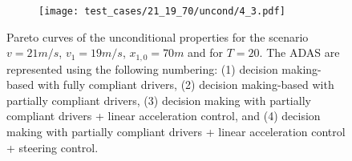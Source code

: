 \begin{figure}[H]
\begin{subfigure}{0.32\textwidth}
\end{subfigure}
\begin{subfigure}{0.32\textwidth}
  \centering
  \texttt{[image: test\_cases/21\_19\_70/uncond/4\_3.pdf]}
\end{subfigure}
\caption{Pareto curves of the unconditional properties for the scenario $v = 21m/s$, $v_1 = 19m/s$, $x_{1,0} = 70m$ and for $T = 20$. The ADAS are represented using the following numbering: (1) decision making-based with fully compliant drivers, (2) decision making-based with partially compliant drivers, (3) decision making with partially compliant drivers + linear acceleration control, and (4) decision making with partially compliant drivers + linear acceleration control + steering control.}
\label{fig:test_case_1_uncond}
\end{figure}



